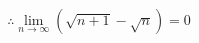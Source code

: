 \documentclass[preview]{standalone}
\begin{document}
\begin{align*}
\therefore \lim_{n\to\infty} \left( \sqrt{n+1} - \sqrt{n} \right) = 0
\end{align*}
\end{document}
